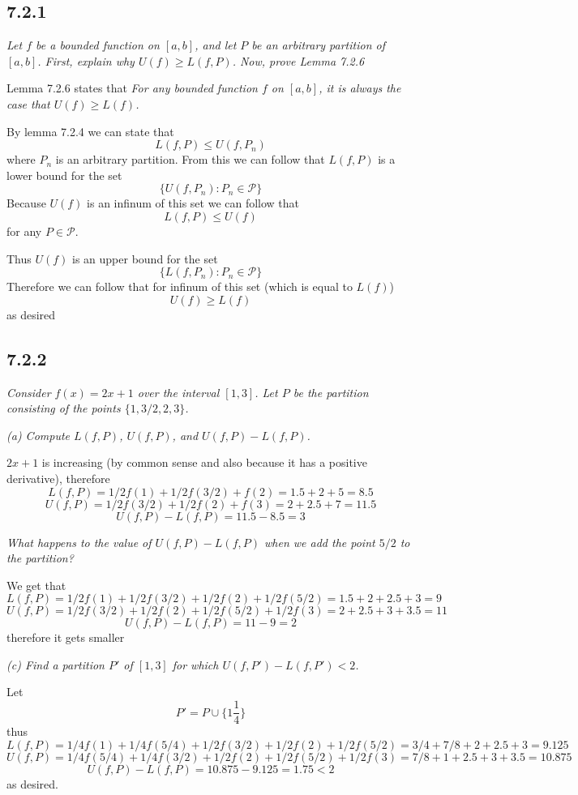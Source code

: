 \documentclass[11pt,oneside,titlepage]{book}
\begin{document}
\subsection*{7.2.1}
\textit{Let $f$ be a bounded function on $[a, b]$, and let $P$ be an arbitrary
  partition of $[a, b]$. First, explain why $U(f) \geq L(f, P)$. Now, prove
  Lemma 7.2.6}

Lemma 7.2.6 states that
\textit{For any bounded function $f$ on $[a, b]$, it is always the case that
$U(f) \geq L(f)$.}

By lemma 7.2.4 we can state that
$$L(f, P) \leq U(f, P_n)$$
where $P_n$ is an arbitrary partition. From this we can follow that
$L(f, P)$ is a lower bound for the set
$$\{U(f, P_n): P_n \in \mathcal{P} \}$$
Because $U(f)$ is an infinum of this set we can follow that
$$L(f, P) \leq U(f)$$
for any $P \in \mathcal{P}$. 

Thus $U(f)$ is an upper bound for the set 
$$\{L(f, P_n): P_n \in \mathcal{P} \}$$
Therefore we can follow that for  infinum of this
set (which is equal to $L(f)$)
$$U(f) \geq L(f)$$
as desired

\subsection*{7.2.2}
\textit{Consider $f(x) = 2x + 1$ over the interval $[1, 3]$. Let $P$ be the
  partition consisting of the points $\{1, 3/2, 2, 3\}$.}

\textit{(a) Compute $L(f, P)$, $U(f, P)$, and $U(f, P) - L(f, P)$.}

$2x + 1$ is increasing (by common sense and also because
it has a positive derivative), therefore
$$L(f, P) = 1/2 f(1) + 1/2 f(3/2) + f(2) = 1.5 + 2 + 5 = 8.5$$
$$U(f, P) = 1/2 f(3/2) + 1/2 f(2) + f(3) = 2 + 2.5 + 7 = 11.5$$
$$U(f, P) - L(f, P) = 11.5 - 8.5 = 3$$

\textit{What happens to the value of $U(f, P) - L(f, P)$ when we add the point
  $5/2$ to the partition?}

We get that
$$L(f, P) = 1/2 f(1) + 1/2 f(3/2) + 1/2 f(2) + 1/2 f(5/2) =
1.5 + 2 + 2.5 + 3 = 9$$
$$U(f, P) = 1/2 f(3/2) + 1/2 f(2) + 1/2 f(5/2) + 1/2 f(3) =
2 + 2.5 + 3 + 3.5 = 11$$
$$U(f, P) - L(f, P) = 11 - 9 = 2$$
therefore it gets smaller

\textit{(c) Find a partition $P'$ of $[1, 3]$ for which
  $U(f, P') - L(f, P') < 2$.}

Let
$$P' = P \cup \{1\frac{1}{4}\}$$
thus
$$L(f, P) = 1/4 f(1) + 1/4 f(5/4) + 1/2 f(3/2) + 1/2 f(2) + 1/2 f(5/2) =
3/4 + 7/8 + 2 + 2.5 + 3 = 9.125$$
$$U(f, P) = 1/4 f(5/4) + 1/4 f(3/2) + 1/2 f(2) + 1/2 f(5/2) + 1/2 f(3) =
7/8 + 1 + 2.5 + 3 + 3.5 = 10.875$$
$$U(f, P) - L(f, P) = 10.875 - 9.125 = 1.75 < 2$$
as desired.
\end{document}
